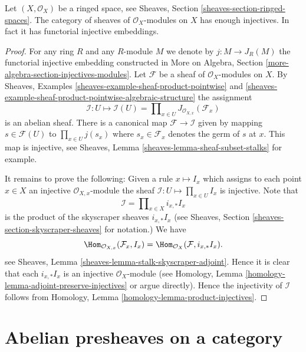 \begin{lemma}
\label{lemma-sheaves-modules-space}
Let $(X, \mathcal{O}_X)$ be a ringed space, see
Sheaves, Section \ref{sheaves-section-ringed-spaces}.
The category of sheaves of $\mathcal{O}_X$-modules on $X$
has enough injectives. In fact it has functorial injective embeddings.
\end{lemma}

\begin{proof}
For any ring $R$ and any $R$-module $M$ we denote by
$j : M \to J_R(M)$ the functorial
injective embedding constructed in
More on Algebra, Section \ref{more-algebra-section-injectives-modules}.
Let $\mathcal{F}$ be a sheaf of $\mathcal{O}_X$-modules on $X$.
By Sheaves, Examples \ref{sheaves-example-sheaf-product-pointwise}
and \ref{sheaves-example-sheaf-product-pointwise-algebraic-structure}
the assignment
$$
\mathcal{I} : U \mapsto
\mathcal{I}(U) = \prod\nolimits_{x\in U} J_{\mathcal{O}_{X, x}}(\mathcal{F}_x)
$$
is an abelian sheaf.
There is a canonical map $\mathcal{F} \to \mathcal{I}$
given by mapping $s \in \mathcal{F}(U)$ to $\prod_{x \in U} j(s_x)$
where $s_x \in \mathcal{F}_x$ denotes the germ of $s$ at $x$.
This map is injective, see
Sheaves, Lemma \ref{sheaves-lemma-sheaf-subset-stalks}
for example.

\medskip\noindent
It remains to prove the following: Given a rule
$x \mapsto I_x$ which assigns to each point $x \in X$ an injective
$\mathcal{O}_{X, x}$-module
the sheaf $\mathcal{I} : U \mapsto \prod_{x \in U} I_x$
is injective. Note that
$$
\mathcal{I} = \prod\nolimits_{x \in X} i_{x, *}I_x
$$
is the product of the skyscraper sheaves $i_{x, *}I_x$ (see
Sheaves, Section \ref{sheaves-section-skyscraper-sheaves} for notation.)
We have
$$
\Hom_{\mathcal{O}_{X, x}}(\mathcal{F}_x, I_x)
=
\Hom_{\mathcal{O}_X}(\mathcal{F}, i_{x, *}I_x).
$$
see Sheaves, Lemma \ref{sheaves-lemma-stalk-skyscraper-adjoint}. Hence it is
clear that each $i_{x, *}I_x$ is an injective $\mathcal{O}_X$-module
(see Homology, Lemma \ref{homology-lemma-adjoint-preserve-injectives} or argue
directly). Hence the injectivity of $\mathcal{I}$ follows from
Homology, Lemma \ref{homology-lemma-product-injectives}.
\end{proof}













\section{Abelian presheaves on a category}
\label{section-injectives-presheaves}


